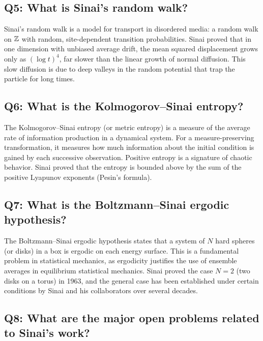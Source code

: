 \subsection*{Q5: What is Sinai's random walk?}

Sinai's random walk is a model for transport in disordered media: a random walk on \(\mathbb{Z}\) with random, site-dependent transition probabilities. Sinai proved that in one dimension with unbiased average drift, the mean squared displacement grows only as \((\log t)^4\), far slower than the linear growth of normal diffusion. This slow diffusion is due to deep valleys in the random potential that trap the particle for long times.

\subsection*{Q6: What is the Kolmogorov--Sinai entropy?}

The Kolmogorov--Sinai entropy (or metric entropy) is a measure of the average rate of information production in a dynamical system. For a measure-preserving transformation, it measures how much information about the initial condition is gained by each successive observation. Positive entropy is a signature of chaotic behavior. Sinai proved that the entropy is bounded above by the sum of the positive Lyapunov exponents (Pesin's formula).

\subsection*{Q7: What is the Boltzmann--Sinai ergodic hypothesis?}

The Boltzmann--Sinai ergodic hypothesis states that a system of \(N\) hard spheres (or disks) in a box is ergodic on each energy surface. This is a fundamental problem in statistical mechanics, as ergodicity justifies the use of ensemble averages in equilibrium statistical mechanics. Sinai proved the case \(N = 2\) (two disks on a torus) in 1963, and the general case has been established under certain conditions by Sinai and his collaborators over several decades.

\subsection*{Q8: What are the major open problems related to Sinai's work?}

